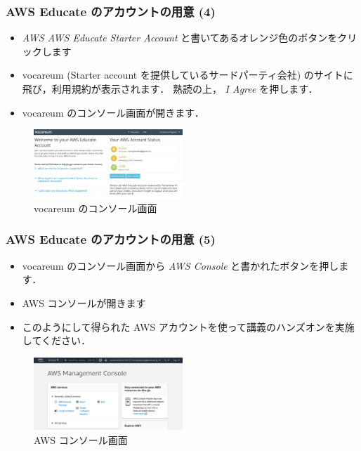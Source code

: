 \documentclass[unicode,11pt]{beamer}
\begin{document}
\begin{frame}
\frametitle{AWS Educate のアカウントの用意 (4)}

\begin{itemize}
    \item \emph{AWS AWS Educate Starter Account} と書いてあるオレンジ色のボタンをクリックします
    \item vocareum (Starter account を提供しているサードパーティ会社) のサイトに飛び，利用規約が表示されます．
    熟読の上， \emph{I Agree} を押します．
    \item vocareum のコンソール画面が開きます．
\end{itemize}

\begin{figure}
    \centering
    \includegraphics[width=0.5\textwidth]{imgs/vocareum_screenshot.png}
    \caption{vocareum のコンソール画面}
\end{figure}

\end{frame}

\begin{frame}
\frametitle{AWS Educate のアカウントの用意 (5)}

\begin{itemize}
    \item vocareum のコンソール画面から \emph{AWS Console} と書かれたボタンを押します．
    \item AWS コンソールが開きます
    \item このようにして得られた AWS アカウントを使って講義のハンズオンを実施してください．
\end{itemize}

\begin{figure}
    \centering
    \includegraphics[width=0.5\textwidth]{imgs/aws_console_screenshot.png}
    \caption{AWS コンソール画面}
\end{figure}

\end{frame}
\end{document}

